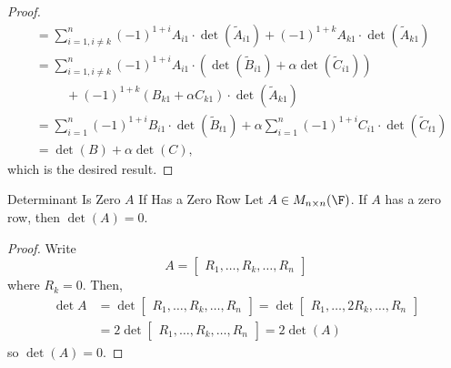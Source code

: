 \documentclass[linearalgebra]{subfiles}
\begin{document}
\begin{proof}
\begin{align*}
                     & = \sum^n_{i=1, i\neq k} (-1)^{1+i} A_{i1} \cdot \det \left(\widetilde{A}_{i1}\right) + (-1)^{1+k} A_{k1} \cdot \det \left(\widetilde{A}_{k1}\right) \\
                     & = \sum^n_{i=1, i\neq k} (-1)^{1+i} A_{i1} \cdot \left( \det \left(\widetilde{B}_{i1}\right) + \alpha \det \left(\widetilde{C}_{i1}\right) \right) \\
                     & \hspace{1cm} + (-1)^{1+k} \left(B_{k1} + \alpha C_{k1}\right) \cdot \det \left(\widetilde{A}_{k1}\right) \\
                     & = \sum^n_{i=1} (-1)^{1+i} B_{i1} \cdot \det \left(\widetilde{B}_{t1}\right) + \alpha \sum^n_{i=1} (-1)^{1+i} C_{i1} \cdot \det \left(\widetilde{C}_{t1}\right) \\
                     & = \det (B) + \alpha \det (C),
        \end{align*}
        which is the desired result.
    \end{proof}

    \begin{cor}{Determinant Is Zero $A$ If Has a Zero Row}
        Let $A\in M_{n\times n}(\F)$. If $A$ has a zero row, then $\det(A) = 0$.
    \end{cor}	

    \begin{proof}
        Write
        \begin{equation*}
            A =
            \begin{bmatrix}
                R_1, \ldots, R_k, \ldots, R_n
            \end{bmatrix}
        \end{equation*}
        where $R_k = 0$. Then,
        \begin{align*}
            \det A 
            & = 
            \det 
            \begin{bmatrix}
                R_1, \ldots, R_k, \ldots, R_n
            \end{bmatrix}
            =
            \det
            \begin{bmatrix}
                R_1, \ldots, 2R_k, \ldots, R_n
            \end{bmatrix} \\
            & =
            2\det
            \begin{bmatrix}
                R_1, \ldots, R_k, \ldots, R_n
            \end{bmatrix}
            =2\det(A)
        \end{align*} 
        so $\det(A) = 0$.
    \end{proof}
\end{document}
